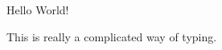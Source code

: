 \documentclass{article}
\begin{document}
Hello World!

This is really a complicated way of typing.
\end{document}
